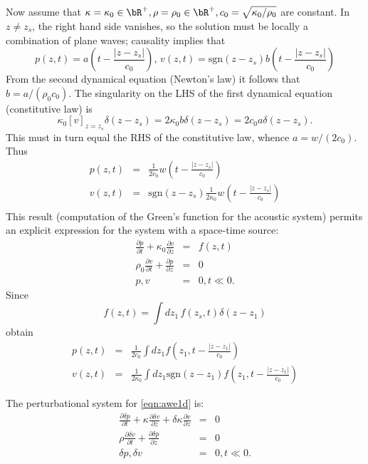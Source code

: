 Now assume that $\kappa=\kappa_0 \in \bR^+, \rho=\rho_0 \in \bR^+, c_0
= \sqrt{\kappa_0/\rho_0}$ are constant. 
In $z \ne z_s$, the right hand side 
vanishes, so the solution must be locally a combination of plane
waves; causality implies that
\[
p(z,t)=a\left(t -\frac{|z-z_s|}{c_0}\right), \, v(z,t)=\mbox{sgn}(z-z_s) b\left(t -
  \frac{|z-z_s|}{c_0}\right)
\]
From the second dynamical equation (Newton's law) it follows that $b =
a/(\rho_0 c_0)$. The singularity on the LHS of the first dynamical
equation (constitutive law) is
\[
\kappa_0 [v]_{z=z_s}\delta(z-z_s) =
2\kappa_0 b\delta(z-z_s) = 2c_0 a\delta(z-z_s).
\] 
This must in turn equal the RHS of the constitutive law, whence
$a=w/(2c_0)$. Thus
\begin{eqnarray}
\label{eqn:sol1dptsrc}
p(z,t) &=& \frac{1}{2c_0}w\left(t - \frac{|z-z_s|}{c_0}\right) \nonumber \\
v(z,t) &=& \mbox{sgn}(z-z_s)\frac{1}{2\kappa_0}w\left(t -\frac{|z-z_s|}{c_0}\right)
           \nonumber \\
\end{eqnarray}
This result (computation of the Green's function for the acoustic
system) permits an explicit expression for the system with a
space-time source:
\begin{eqnarray}
\label{eqn:awe1d}
\frac{\partial p}{\partial t} +\kappa_0\frac{\partial 
  v}{\partial z} &=& f(z,t) \nonumber\\
\rho_0 \frac{\partial v}{\partial t} + \frac{\partial p}{\partial 
  z}&=&0\nonumber\\
 p,v&=&0, t \ll 0. 
\end{eqnarray}
Since
\[
  f(z,t) = \int dz_1\,f(z_s,t)\delta(z-z_1)
\]
obtain
\begin{eqnarray}
\label{eqn:sol1dp}
p(z,t) &=& \frac{1}{2c_0}\int dz_1 f\left(z_1,t -
           \frac{|z-z_1|}{c_0}\right) \\
  \label{eqn:sol1dv}
v(z,t) &=& \frac{1}{2\kappa_0} \int dz_1 \mbox{sgn} (z-z_1) f\left(z_1,t - \frac{|z-z_1|}{c_0}\right)
\end{eqnarray}


The perturbational system for \ref{eqn:awe1d} is:
\begin{eqnarray}
\label{eqn:dawe1d}
\frac{\partial \delta p}{\partial t} +\kappa\frac{\partial
  \delta v}{\partial z} + \delta \kappa\frac{\partial
  v}{\partial z} &=& 0 \nonumber\\
\rho \frac{\partial \delta v}{\partial t} + \frac{\partial \delta p}{\partial
  z}&=&0\nonumber\\
\delta p,\delta v&=&0, t \ll 0.
\end{eqnarray}


